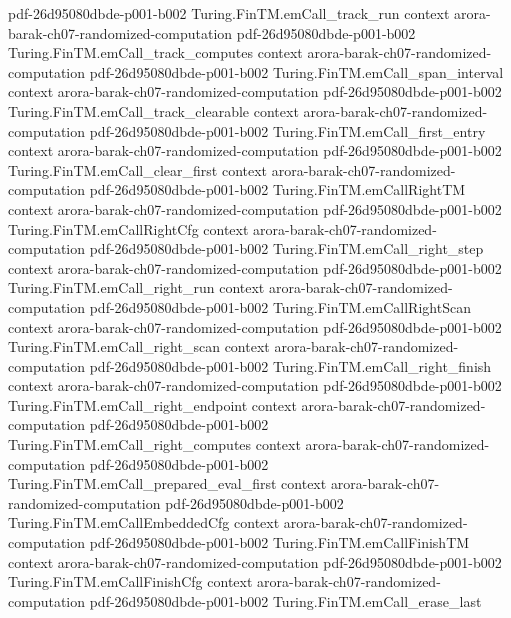 \begin{theorem}
  {pdf-26d95080dbde-p001-b002}
\proofstep
  {Turing.FinTM.emCall_track_run}
  {context}
  {arora-barak-ch07-randomized-computation}
  {pdf-26d95080dbde-p001-b002}
\proofstep
  {Turing.FinTM.emCall_track_computes}
  {context}
  {arora-barak-ch07-randomized-computation}
  {pdf-26d95080dbde-p001-b002}
\proofstep
  {Turing.FinTM.emCall_span_interval}
  {context}
  {arora-barak-ch07-randomized-computation}
  {pdf-26d95080dbde-p001-b002}
\proofstep
  {Turing.FinTM.emCall_track_clearable}
  {context}
  {arora-barak-ch07-randomized-computation}
  {pdf-26d95080dbde-p001-b002}
\proofstep
  {Turing.FinTM.emCall_first_entry}
  {context}
  {arora-barak-ch07-randomized-computation}
  {pdf-26d95080dbde-p001-b002}
\proofstep
  {Turing.FinTM.emCall_clear_first}
  {context}
  {arora-barak-ch07-randomized-computation}
  {pdf-26d95080dbde-p001-b002}
\proofstep
  {Turing.FinTM.emCallRightTM}
  {context}
  {arora-barak-ch07-randomized-computation}
  {pdf-26d95080dbde-p001-b002}
\proofstep
  {Turing.FinTM.emCallRightCfg}
  {context}
  {arora-barak-ch07-randomized-computation}
  {pdf-26d95080dbde-p001-b002}
\proofstep
  {Turing.FinTM.emCall_right_step}
  {context}
  {arora-barak-ch07-randomized-computation}
  {pdf-26d95080dbde-p001-b002}
\proofstep
  {Turing.FinTM.emCall_right_run}
  {context}
  {arora-barak-ch07-randomized-computation}
  {pdf-26d95080dbde-p001-b002}
\proofstep
  {Turing.FinTM.emCallRightScan}
  {context}
  {arora-barak-ch07-randomized-computation}
  {pdf-26d95080dbde-p001-b002}
\proofstep
  {Turing.FinTM.emCall_right_scan}
  {context}
  {arora-barak-ch07-randomized-computation}
  {pdf-26d95080dbde-p001-b002}
\proofstep
  {Turing.FinTM.emCall_right_finish}
  {context}
  {arora-barak-ch07-randomized-computation}
  {pdf-26d95080dbde-p001-b002}
\proofstep
  {Turing.FinTM.emCall_right_endpoint}
  {context}
  {arora-barak-ch07-randomized-computation}
  {pdf-26d95080dbde-p001-b002}
\proofstep
  {Turing.FinTM.emCall_right_computes}
  {context}
  {arora-barak-ch07-randomized-computation}
  {pdf-26d95080dbde-p001-b002}
\proofstep
  {Turing.FinTM.emCall_prepared_eval_first}
  {context}
  {arora-barak-ch07-randomized-computation}
  {pdf-26d95080dbde-p001-b002}
\proofstep
  {Turing.FinTM.emCallEmbeddedCfg}
  {context}
  {arora-barak-ch07-randomized-computation}
  {pdf-26d95080dbde-p001-b002}
\proofstep
  {Turing.FinTM.emCallFinishTM}
  {context}
  {arora-barak-ch07-randomized-computation}
  {pdf-26d95080dbde-p001-b002}
\proofstep
  {Turing.FinTM.emCallFinishCfg}
  {context}
  {arora-barak-ch07-randomized-computation}
  {pdf-26d95080dbde-p001-b002}
\proofstep
  {Turing.FinTM.emCall_erase_last}

\end{theorem}
